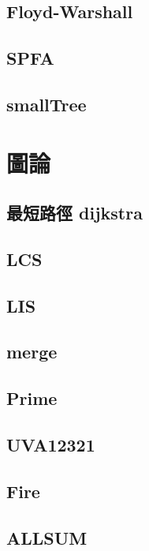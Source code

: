     \subsection{Floyd-Warshall}
        
    \subsection{SPFA}
        
    \subsection{smallTree}
        

\section{圖論}
    \subsection{最短路徑 dijkstra}
        
    \subsection{LCS}
        
    \subsection{LIS}
        
    \subsection{merge}
          
    \subsection{Prime}
        
    \subsection{UVA12321}
        
    \subsection{Fire}
        
    \subsection{ALLSUM}
        
